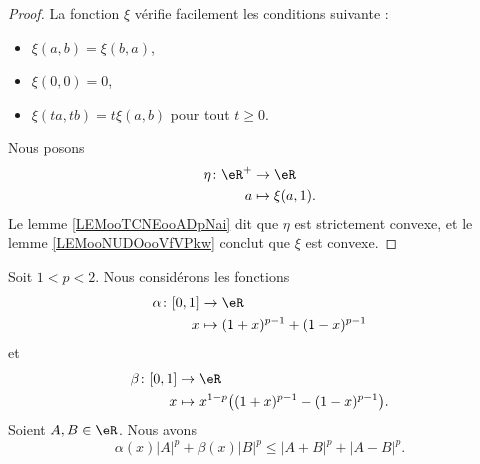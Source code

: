 \begin{proof}
	La fonction \( \xi\) vérifie facilement les conditions suivante :
	\begin{itemize}
		\item \( \xi(a,b)=\xi(b,a)\),
		\item \( \xi(0,0)=0\),
		\item \( \xi(ta,tb)=t\xi(a,b)\) pour tout \( t\geq 0\).
	\end{itemize}
	Nous posons
	\begin{equation}
		\begin{aligned}
			\eta\colon \eR^+ & \to \eR           \\
			a                & \mapsto \xi(a,1).
		\end{aligned}
	\end{equation}
	Le lemme \ref{LEMooTCNEooADpNai} dit que \( \eta\) est strictement convexe, et le lemme \ref{LEMooNUDOooVfVPkw} conclut que \( \xi\) est convexe.
\end{proof}

\begin{lemma}     \label{LEMooWIPYooMZqjbn}
	Soit \( 1<p<2\). Nous considérons les fonctions
	\begin{equation}
		\begin{aligned}
			\alpha\colon \mathopen[ 0 , 1 \mathclose] & \to \eR                         \\
			x                                         & \mapsto (1+x)^{p-1}+(1-x)^{p-1}
		\end{aligned}
	\end{equation}
	et
	\begin{equation}
		\begin{aligned}
			\beta\colon \mathopen[ 0 , 1 \mathclose] & \to \eR                                             \\
			x                                        & \mapsto x^{1-p}\big( (1+x)^{p-1}-(1-x)^{p-1} \big).
		\end{aligned}
	\end{equation}
	Soient \( A,B\in \eR\). Nous avons
	\begin{equation}
		\alpha(x)| A |^p+\beta(x)| B |^p\leq | A+B |^p+| A-B |^p.
	\end{equation}
\end{lemma}

